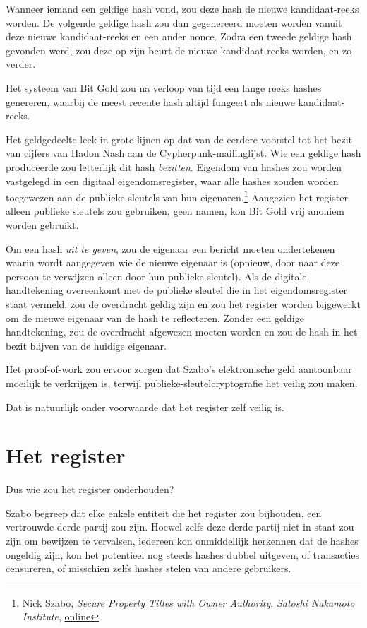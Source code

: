 \documentclass[
  a5paper,
  smalldemyvopaper,11pt,twoside,onecolumn,openright,extrafontsizes,
hidelinks]{memoir}
\begin{document}
Wanneer iemand een geldige hash vond, zou deze hash de nieuwe
kandidaat-reeks worden. De volgende geldige hash zou dan gegenereerd
moeten worden vanuit deze nieuwe kandidaat-reeks en een ander nonce.
Zodra een tweede geldige hash gevonden werd, zou deze op zijn beurt de
nieuwe kandidaat-reeks worden, en zo verder.

Het systeem van Bit Gold zou na verloop van tijd een lange reeks hashes
genereren, waarbij de meest recente hash altijd fungeert als nieuwe
kandidaat-reeks.

Het geldgedeelte leek in grote lijnen op dat van de eerdere voorstel tot
het bezit van cijfers van Hadon Nash aan de Cypherpunk-mailinglijst. Wie
een geldige hash produceerde zou letterlijk dit hash \emph{bezitten}.
Eigendom van hashes zou worden vastgelegd in een digitaal
eigendomsregister, waar alle hashes zouden worden toegewezen aan de
publieke sleutels van hun eigenaren.\footnote{Nick Szabo, \emph{Secure
  Property Titles with Owner Authority}, \emph{Satoshi Nakamoto
  Institute},
  \href{https://nakamotoinstitute.org/library/secure-property-titles/}{online}}
Aangezien het register alleen publieke sleutels zou gebruiken, geen
namen, kon Bit Gold vrij anoniem worden gebruikt.

Om een hash \emph{uit te geven}, zou de eigenaar een bericht moeten
ondertekenen waarin wordt aangegeven wie de nieuwe eigenaar is (opnieuw,
door naar deze persoon te verwijzen alleen door hun publieke sleutel).
Als de digitale handtekening overeenkomt met de publieke sleutel die in
het eigendomsregister staat vermeld, zou de overdracht geldig zijn en
zou het register worden bijgewerkt om de nieuwe eigenaar van de hash te
reflecteren. Zonder een geldige handtekening, zou de overdracht
afgewezen moeten worden en zou de hash in het bezit blijven van de
huidige eigenaar.

Het proof-of-work zou ervoor zorgen dat Szabo's elektronische geld
aantoonbaar moeilijk te verkrijgen is, terwijl
publieke-sleutelcryptografie het veilig zou maken.

Dat is natuurlijk onder voorwaarde dat het register zelf veilig is.

\section{Het register}\label{het-register}

Dus wie zou het register onderhouden?

Szabo begreep dat elke enkele entiteit die het register zou bijhouden,
een vertrouwde derde partij zou zijn. Hoewel zelfs deze derde partij
niet in staat zou zijn om bewijzen te vervalsen, iedereen kon
onmiddellijk herkennen dat de hashes ongeldig zijn, kon het potentieel
nog steeds hashes dubbel uitgeven, of transacties censureren, of
misschien zelfs hashes stelen van andere gebruikers.
\end{document}
